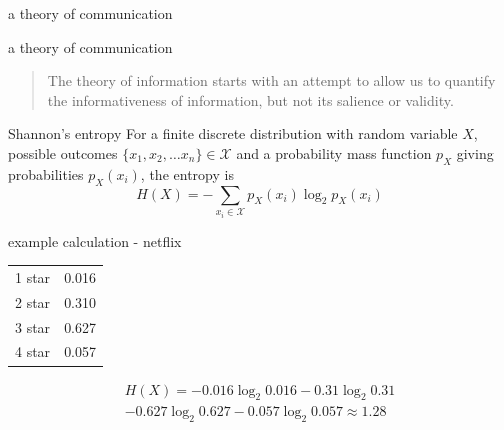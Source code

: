 \documentclass{beamer}
\newcommand{\crish}{\color{reddish}}
\newcommand{\cbla}{\color{black}}
\newcommand{\sm}{\color{reddish}$}
\newcommand{\fm}{$\color{black}}
\begin{document}
\begin{frame}{a theory of communication}
  \begin{center}
  \end{center}
\end{frame}

\begin{frame}{a theory of communication}
  \begin{quote}
    The theory of information starts with an attempt to allow us to
quantify the informativeness of information, but not its salience or
validity.
  \end{quote}
  \end{frame}

\begin{frame}{Shannon's entropy}
  For a finite discrete distribution with random variable \sm X\fm,
  possible outcomes \sm\{x_1,x_2,\ldots x_n\}\in\mathcal{X}\fm{} and a
  probability mass function \sm p_X\fm{} giving probabilities \sm p_X(x_i)\fm, the
  entropy is
\crish
  $$
H(X)=-\sum_{x_i\in \mathcal{X}}{p_X(x_i)\log_2p_X(x_i)}
  $$
\cbla
\end{frame}

\begin{frame}{example calculation - netflix}
  \begin{center}
    \begin{tabular}{l|l}
      \hline
      1 star&0.016\\
      2 star&0.310\\
      3 star&0.627\\
      4 star&0.057\\
      \hline
    \end{tabular}
  \end{center}
  \crish
  \begin{multline*}
    H(X)=-0.016\log_2{0.016}-0.31\log_2{0.31}\\
    -0.627\log_2{0.627}-0.057\log_2{0.057}\approx 1.28
\end{multline*}
\cbla
\end{frame}  
\end{document}
